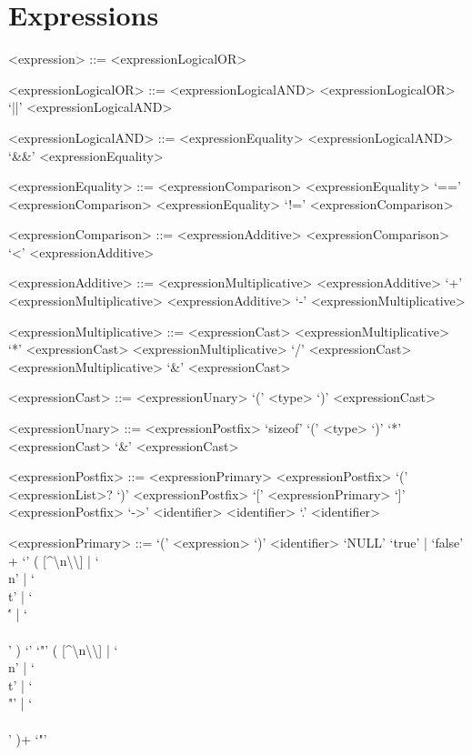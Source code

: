 \section{Expressions}

\setlength{\grammarparsep}{20pt plus 1pt minus 1pt}
\setlength{\grammarindent}{10em}
\begin{grammar}

<expression> ::= <expressionLogicalOR>

<expressionLogicalOR> ::= <expressionLogicalAND>
\alt <expressionLogicalOR> `||' <expressionLogicalAND>

<expressionLogicalAND> ::= <expressionEquality>
\alt <expressionLogicalAND> `&&' <expressionEquality>

<expressionEquality> ::= <expressionComparison>
\alt <expressionEquality> `==' <expressionComparison>
\alt <expressionEquality> `!=' <expressionComparison>

<expressionComparison> ::= <expressionAdditive>
\alt <expressionComparison> `<' <expressionAdditive>

<expressionAdditive> ::= <expressionMultiplicative>
\alt <expressionAdditive> `+' <expressionMultiplicative>
\alt <expressionAdditive> `-' <expressionMultiplicative>

<expressionMultiplicative> ::= <expressionCast>
\alt <expressionMultiplicative> `*' <expressionCast>
\alt <expressionMultiplicative> `/' <expressionCast>
\alt <expressionMultiplicative> `&' <expressionCast>

<expressionCast> ::= <expressionUnary>
\alt `(' <type> `)' <expressionCast>

<expressionUnary> ::= <expressionPostfix>
\alt `sizeof' `(' <type> `)'
\alt `*' <expressionCast>
\alt `&' <expressionCast>

<expressionPostfix> ::= <expressionPrimary>
\alt <expressionPostfix> `(' <expressionList>? `)'
\alt <expressionPostfix> `[' <expressionPrimary> `]'
\alt <expressionPostfix> `->' <identifier>
\alt <identifier> `.' <identifier>

<expressionPrimary> ::= `(' <expression> `)'
\alt <identifier>
\alt `NULL'
\alt `true' | `false'
\alt [0-9]+
\alt `\textquotesingle' ( [\^{}\textquotesingle\textbackslash n\textbackslash\textbackslash] | `\\n' | `\\t' | `\\\'' | `\\\\' ) `\textquotesingle'
\alt `"' ( [\^{}\textquotedbl\textbackslash n\textbackslash\textbackslash] | `\\n' | `\\t' | `\\"' | `\\\\' )+ `"'

\end{grammar}
